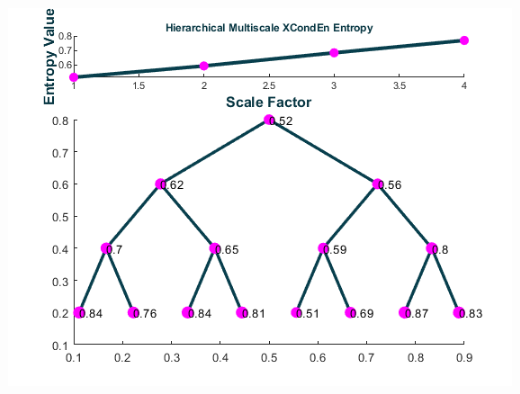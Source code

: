 \documentclass[12pt, a4paper, titlepage, openany]{book}
\begin{document}
\includegraphics[scale=.7]{xhier.png}\newline \newline


\newpage
\end{document}
